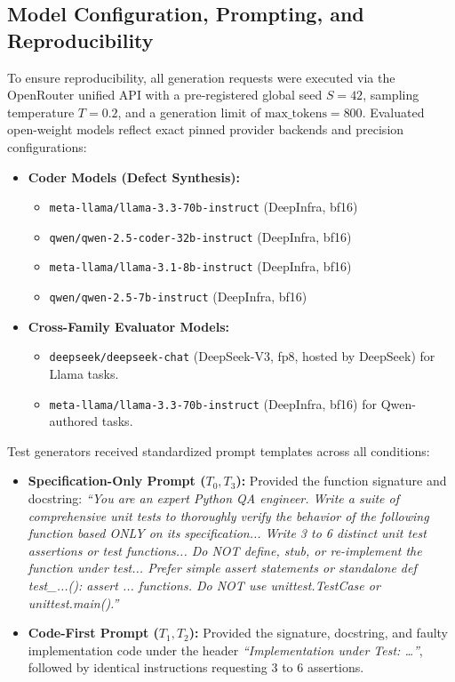 \documentclass[11pt,a4paper]{article}
\begin{document}
\subsection{Model Configuration, Prompting, and Reproducibility}
To ensure reproducibility, all generation requests were executed via the OpenRouter unified API with a pre-registered global seed $S=42$, sampling temperature $T=0.2$, and a generation limit of $\text{max\_tokens}=800$.
Evaluated open-weight models reflect exact pinned provider backends and precision configurations:
\begin{itemize}
    \item \textbf{Coder Models (Defect Synthesis):}
    \begin{itemize}
        \item \texttt{meta-llama/llama-3.3-70b-instruct} (DeepInfra, bf16)
        \item \texttt{qwen/qwen-2.5-coder-32b-instruct} (DeepInfra, bf16)
        \item \texttt{meta-llama/llama-3.1-8b-instruct} (DeepInfra, bf16)
        \item \texttt{qwen/qwen-2.5-7b-instruct} (DeepInfra, bf16)
    \end{itemize}
    \item \textbf{Cross-Family Evaluator Models:}
    \begin{itemize}
        \item \texttt{deepseek/deepseek-chat} (DeepSeek-V3, fp8, hosted by DeepSeek) for Llama tasks.
        \item \texttt{meta-llama/llama-3.3-70b-instruct} (DeepInfra, bf16) for Qwen-authored tasks.
    \end{itemize}
\end{itemize}

Test generators received standardized prompt templates across all conditions:
\begin{itemize}
    \item \textbf{Specification-Only Prompt ($T_0, T_3$):} Provided the function signature and docstring: \textit{``You are an expert Python QA engineer. Write a suite of comprehensive unit tests to thoroughly verify the behavior of the following function based ONLY on its specification... Write 3 to 6 distinct unit test assertions or test functions... Do NOT define, stub, or re-implement the function under test... Prefer simple assert statements or standalone def test\_...(): assert ... functions. Do NOT use unittest.TestCase or unittest.main().''}
    \item \textbf{Code-First Prompt ($T_1, T_2$):} Provided the signature, docstring, and faulty implementation code under the header \textit{``Implementation under Test: \dots''}, followed by identical instructions requesting 3 to 6 assertions.
\end{itemize}
\end{document}
